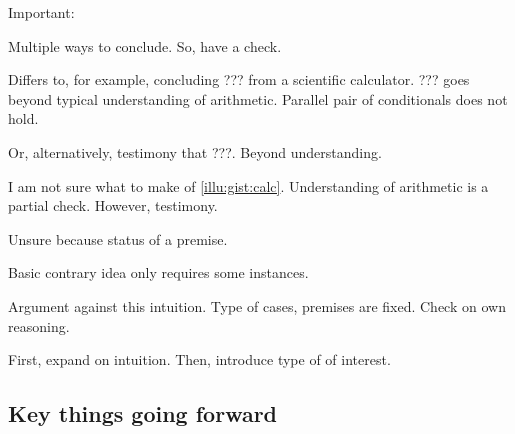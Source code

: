 \begin{note}
  Important:

  Multiple ways to conclude.
  So, have a check.

  Differs to, for example, concluding {\color{red} ???} from a scientific calculator.
  {\color{red} ???} goes beyond typical understanding of arithmetic.
  Parallel pair of conditionals does not hold.

  Or, alternatively, testimony that {\color{red} ???}.
  Beyond understanding.
\end{note}

\begin{note}
  I am not sure what to make of \ref{illu:gist:calc}.
  Understanding of arithmetic is a partial check.
  However, testimony.

  Unsure because status of a premise.

  Basic contrary idea only requires some instances.

  Argument against this intuition.
  Type of cases, premises are fixed.
  Check on own reasoning.

  First, expand on intuition.
  Then, introduce type of  of interest.
\end{note}

\subsection{Key things going forward}

